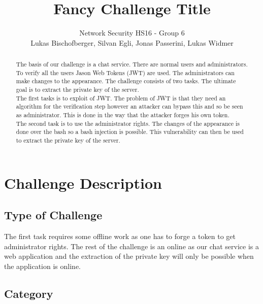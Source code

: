 \documentclass[12pt,a4paper]{article}
\title{Fancy Challenge Title} %
\author{Network Security HS16 - Group 6\\Lukas Bischofberger, Silvan Egli, Jonas Passerini, Lukas Widmer}
\begin{document}
\maketitle

\begin{abstract}

The basis of our challenge is a chat service. There are normal users and administrators. To verify all the users Jason Web Tokens (JWT) are used. The administrators can make changes to the appearance. The challenge consists of two tasks. The ultimate goal is to extract the private key of the server. \\
The first tasks is to exploit of JWT. The problem of JWT is that they need an algorithm for the verification step however an attacker can bypass this and so be seen as administrator. This is done in the way that the attacker forges his own token.\\
The second task is to use the administrator rights. The changes of the appearance is done over the bash so a bash injection is possible. This vulnerability can then be used to extract the private key of the server.
\end{abstract}

\section{Challenge Description}

\subsection{Type of Challenge}
The first task requires some offline work as one has to forge a token to get administrator rights. The rest of the challenge is an online as our chat service is a web application and the extraction of the private key will only be possible when the application is online.

\subsection{Category}
\end{document}
